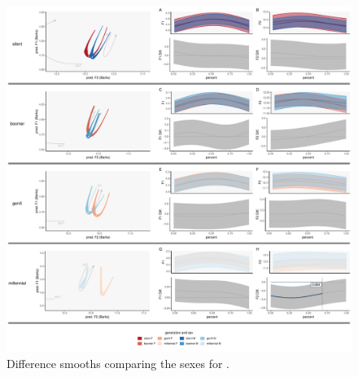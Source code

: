 \begin{figure}[p]
    \centering
    \includegraphics[width=\textwidth]{Figures/BIT/BIT_sex_panel_plot.pdf}
    \caption{Difference smooths comparing the sexes for \bit.}
    \label{fig:bit_diff_smooths_sex_gen}
\end{figure}



